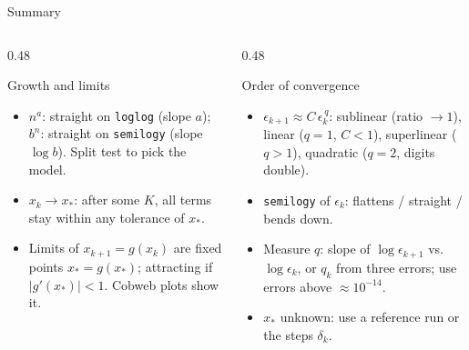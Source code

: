 \documentclass[aspectratio=169]{beamer}
\begin{document}
\begin{frame}{Summary}
\begin{columns}[T]
\begin{column}{0.48\textwidth}
\begin{block}{Growth and limits}
\footnotesize
\begin{itemize}
  \item $n^a$: straight on \texttt{loglog} (slope $a$); $b^n$: straight on \texttt{semilogy} (slope $\log b$). Split test to pick the model.
  \item $x_k \to x_\ast$: after some $K$, all terms stay within any tolerance of $x_\ast$.
  \item Limits of $x_{k+1} = g(x_k)$ are fixed points $x_\ast = g(x_\ast)$; attracting if $|g'(x_\ast)| < 1$. Cobweb plots show it.
\end{itemize}
\end{block}
\end{column}
\begin{column}{0.48\textwidth}
\begin{block}{Order of convergence}
\footnotesize
\begin{itemize}
  \item $\epsilon_{k+1} \approx C\,\epsilon_k^{\,q}$: sublinear (ratio $\to 1$), linear ($q = 1$, $C < 1$), superlinear ($q > 1$), quadratic ($q = 2$, digits double).
  \item \texttt{semilogy} of $\epsilon_k$: flattens / straight / bends down.
  \item Measure $q$: slope of $\log\epsilon_{k+1}$ vs.\ $\log\epsilon_k$, or $q_k$ from three errors; use errors above $\approx 10^{-14}$.
  \item $x_\ast$ unknown: use a reference run or the steps $\delta_k$.
\end{itemize}
\end{block}
\end{column}
\end{columns}
\end{frame}
\end{document}
